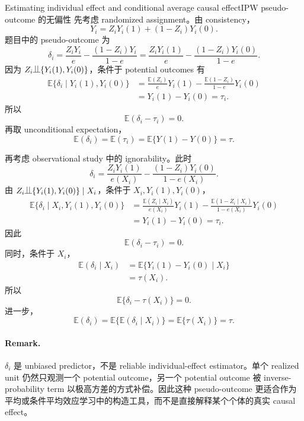 \begin{exercisesolution}{Estimating individual effect and conditional average causal effect}{IPW pseudo-outcome 的无偏性}
先考虑 randomized assignment。由 consistency，
\[
Y_i=Z_iY_i(1)+(1-Z_i)Y_i(0).
\]
题目中的 pseudo-outcome 为
\[
\delta_i=\frac{Z_iY_i}{e}-\frac{(1-Z_i)Y_i}{1-e}
=\frac{Z_iY_i(1)}{e}-\frac{(1-Z_i)Y_i(0)}{1-e}.
\]
因为 $Z_i\ind\{Y_i(1),Y_i(0)\}$，条件于 potential outcomes 有
\begin{align*}
\mathbb{E}\{\delta_i\mid Y_i(1),Y_i(0)\}
&=\frac{\mathbb{E}(Z_i)}{e}Y_i(1)
  -\frac{\mathbb{E}(1-Z_i)}{1-e}Y_i(0)\\
&=Y_i(1)-Y_i(0)
=\tau_i.
\end{align*}
所以
\[
\mathbb{E}(\delta_i-\tau_i)=0.
\]
再取 unconditional expectation，
\[
\mathbb{E}(\delta_i)=\mathbb{E}(\tau_i)
=\mathbb{E}\{Y(1)-Y(0)\}
=\tau.
\]

再考虑 observational study 中的 ignorability。此时
\[
\delta_i
=\frac{Z_iY_i(1)}{e(X_i)}
 -\frac{(1-Z_i)Y_i(0)}{1-e(X_i)}.
\]
由 $Z_i\ind\{Y_i(1),Y_i(0)\}\mid X_i$，条件于 $X_i,Y_i(1),Y_i(0)$，
\begin{align*}
\mathbb{E}\{\delta_i\mid X_i,Y_i(1),Y_i(0)\}
&=\frac{\mathbb{E}(Z_i\mid X_i)}{e(X_i)}Y_i(1)
 -\frac{\mathbb{E}(1-Z_i\mid X_i)}{1-e(X_i)}Y_i(0)\\
&=Y_i(1)-Y_i(0)
=\tau_i.
\end{align*}
因此
\[
\mathbb{E}(\delta_i-\tau_i)=0.
\]
同时，条件于 $X_i$，
\begin{align*}
\mathbb{E}(\delta_i\mid X_i)
&=\mathbb{E}\{Y_i(1)-Y_i(0)\mid X_i\}\\
&=\tau(X_i).
\end{align*}
所以
\[
\mathbb{E}\{\delta_i-\tau(X_i)\}=0.
\]
进一步，
\[
\mathbb{E}(\delta_i)
=\mathbb{E}\{\mathbb{E}(\delta_i\mid X_i)\}
=\mathbb{E}\{\tau(X_i)\}
=\tau.
\]

\paragraph{Remark.}
$\delta_i$ 是 unbiased predictor，不是 reliable individual-effect estimator。单个 realized unit 仍然只观测一个 potential outcome，另一个 potential outcome 被 inverse-probability term 以极高方差的方式补偿。因此这种 pseudo-outcome 更适合作为平均或条件平均效应学习中的构造工具，而不是直接解释某个个体的真实 causal effect。
\end{exercisesolution}

